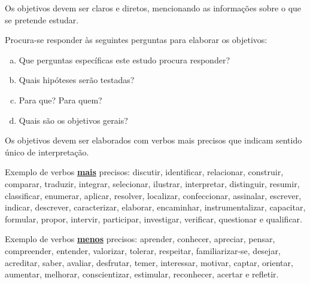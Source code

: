 \documentclass[../Main.tex]{subfiles}
\begin{document}
    Os objetivos devem ser claros e diretos, mencionando as informações sobre o que se pretende estudar.
    
    Procura-se responder às seguintes perguntas para elaborar os objetivos:
    
    \begin{enumerate}[a)]
        \item Que perguntas específicas este estudo procura responder?
        \item Quais hipóteses serão testadas?
        \item Para que? Para quem?
        \item Quais são os objetivos gerais?
    \end{enumerate}
    
    Os objetivos devem ser elaborados com verbos mais precisos que indicam sentido único de interpretação.
    
    Exemplo de verbos \textbf{\underline{mais}} precisos: discutir, identificar, relacionar, construir, comparar, traduzir, integrar, selecionar, ilustrar, interpretar, distinguir, resumir, classificar, enumerar, aplicar, resolver, localizar, confeccionar, assinalar, escrever, indicar, descrever, caracterizar, elaborar, encaminhar, instrumentalizar, capacitar, formular, propor, intervir, participar, investigar, verificar, questionar e qualificar.
    
    Exemplo de verbos \textbf{\underline{menos}} precisos: aprender, conhecer, apreciar, pensar, compreender, entender, valorizar, tolerar, respeitar, familiarizar-se, desejar, acreditar, saber, avaliar, desfrutar, temer, interessar, motivar, captar, orientar, aumentar, melhorar, conscientizar, estimular, reconhecer, acertar e refletir.
	
\end{document}
